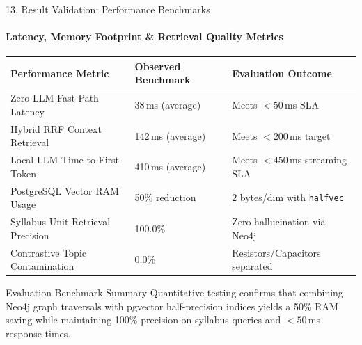 \documentclass[aspectratio=169, 11pt]{beamer}
\begin{document}
\begin{frame}{13. Result Validation: Performance Benchmarks}
    \framesubtitle{Latency, Memory Footprint \& Retrieval Quality Metrics}
    \begin{table}
        \centering
        \footnotesize
        \renewcommand{\arraystretch}{1.25}
        \begin{tabular}{p{4.2cm} p{3.2cm} p{3.6cm}}
            \toprule
            \textbf{Performance Metric} & \textbf{Observed Benchmark} & \textbf{Evaluation Outcome} \\
            \midrule
            Zero-LLM Fast-Path Latency & 38\,ms (average) & Meets $<50$\,ms SLA \\
            Hybrid RRF Context Retrieval & 142\,ms (average) & Meets $<200$\,ms target \\
            Local LLM Time-to-First-Token & 410\,ms (average) & Meets $<450$\,ms streaming SLA \\
            PostgreSQL Vector RAM Usage & 50\% reduction & 2 bytes/dim with \texttt{halfvec} \\
            Syllabus Unit Retrieval Precision & 100.0\% & Zero hallucination via Neo4j \\
            Contrastive Topic Contamination & 0.0\% & Resistors/Capacitors separated \\
            \bottomrule
        \end{tabular}
    \end{table}

    \begin{block}{Evaluation Benchmark Summary}
        \footnotesize
        Quantitative testing confirms that combining Neo4j graph traversals with pgvector half-precision indices yields a 50\% RAM saving while maintaining 100\% precision on syllabus queries and $<50$\,ms response times.
    \end{block}
\end{frame}
\end{document}
